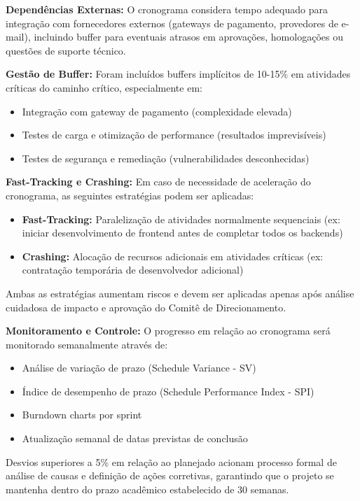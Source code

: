 \textbf{Dependências Externas:}
O cronograma considera tempo adequado para integração com fornecedores externos (gateways de pagamento, provedores de e-mail), incluindo buffer para eventuais atrasos em aprovações, homologações ou questões de suporte técnico.

\textbf{Gestão de Buffer:}
Foram incluídos buffers implícitos de 10-15\% em atividades críticas do caminho crítico, especialmente em:
\begin{itemize}
    \item Integração com gateway de pagamento (complexidade elevada)
    \item Testes de carga e otimização de performance (resultados imprevisíveis)
    \item Testes de segurança e remediação (vulnerabilidades desconhecidas)
\end{itemize}

\textbf{Fast-Tracking e Crashing:}
Em caso de necessidade de aceleração do cronograma, as seguintes estratégias podem ser aplicadas:
\begin{itemize}
    \item \textbf{Fast-Tracking:} Paralelização de atividades normalmente sequenciais (ex: iniciar desenvolvimento de frontend antes de completar todos os backends)
    \item \textbf{Crashing:} Alocação de recursos adicionais em atividades críticas (ex: contratação temporária de desenvolvedor adicional)
\end{itemize}

Ambas as estratégias aumentam riscos e devem ser aplicadas apenas após análise cuidadosa de impacto e aprovação do Comitê de Direcionamento.

\textbf{Monitoramento e Controle:}
O progresso em relação ao cronograma será monitorado semanalmente através de:
\begin{itemize}
    \item Análise de variação de prazo (Schedule Variance - SV)
    \item Índice de desempenho de prazo (Schedule Performance Index - SPI)
    \item Burndown charts por sprint
    \item Atualização semanal de datas previstas de conclusão
\end{itemize}

Desvios superiores a 5\% em relação ao planejado acionam processo formal de análise de causas e definição de ações corretivas, garantindo que o projeto se mantenha dentro do prazo acadêmico estabelecido de 30 semanas.